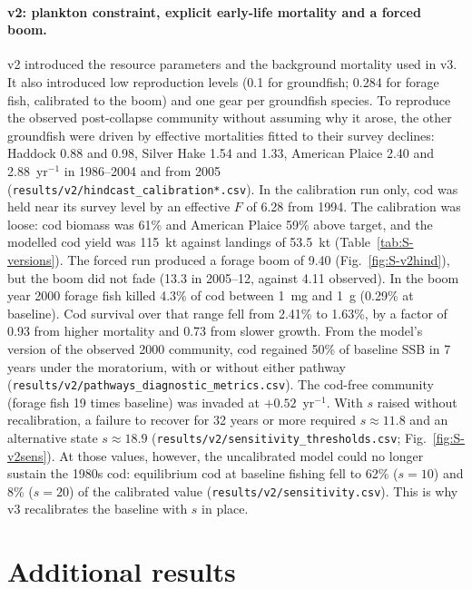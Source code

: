 \documentclass[11pt,letterpaper,fleqn]{article}
\newcommand{\yr}{yr$^{-1}$}
\begin{document}
\paragraph{v2: plankton constraint, explicit early-life mortality and a forced boom.} v2 introduced the resource parameters and the background mortality used in v3. It also introduced low reproduction levels (0.1 for groundfish; 0.284 for forage fish, calibrated to the boom) and one gear per groundfish species. To reproduce the observed post-collapse community without assuming why it arose, the other groundfish were driven by effective mortalities fitted to their survey declines: Haddock 0.88 and 0.98, Silver Hake 1.54 and 1.33, American Plaice 2.40 and 2.88~\yr{} in 1986--2004 and from 2005 (\nolinkurl{results/v2/hindcast_calibration*.csv}). In the calibration run only, cod was held near its survey level by an effective $F$ of 6.28 from 1994. The calibration was loose: cod biomass was 61\% and American Plaice 59\% above target, and the modelled cod yield was 115~kt against landings of 53.5~kt (Table~\ref{tab:S-versions}). The forced run produced a forage boom of 9.40 (Fig.~\ref{fig:S-v2hind}), but the boom did not fade (13.3 in 2005--12, against 4.11 observed). In the boom year 2000 forage fish killed 4.3\% of cod between 1~mg and 1~g (0.29\% at baseline). Cod survival over that range fell from 2.41\% to 1.63\%, by a factor of 0.93 from higher mortality and 0.73 from slower growth. From the model's version of the observed 2000 community, cod regained 50\% of baseline SSB in 7 years under the moratorium, with or without either pathway (\nolinkurl{results/v2/pathways_diagnostic_metrics.csv}). The cod-free community (forage fish 19 times baseline) was invaded at $+0.52$~\yr{}. With $s$ raised without recalibration, a failure to recover for 32 years or more required $s\approx11.8$ and an alternative state $s\approx18.9$ (\nolinkurl{results/v2/sensitivity_thresholds.csv}; Fig.~\ref{fig:S-v2sens}). At those values, however, the uncalibrated model could no longer sustain the 1980s cod: equilibrium cod at baseline fishing fell to 62\% ($s=10$) and 8\% ($s=20$) of the calibrated value (\nolinkurl{results/v2/sensitivity.csv}). This is why v3 recalibrates the baseline with $s$ in place.

\section{Additional results}\label{sec:S-results}
\end{document}
